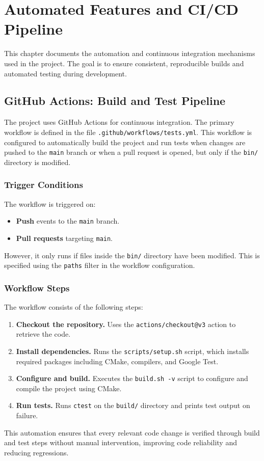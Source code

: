 \chapter{Automated Features and CI/CD Pipeline}
\label{ch:ci-cd}
\pagestyle{fancy}

This chapter documents the automation and continuous integration mechanisms used in the project. The goal is to ensure consistent, reproducible builds and automated testing during development.

\section{GitHub Actions: Build and Test Pipeline}
\label{sec:github-actions}

The project uses GitHub Actions for continuous integration. The primary workflow is defined in the file \texttt{.github/workflows/tests.yml}. This workflow is configured to automatically build the project and run tests when changes are pushed to the \texttt{main} branch or when a pull request is opened, but only if the \texttt{bin/} directory is modified.

\subsection*{Trigger Conditions}

The workflow is triggered on:
\begin{itemize}\itemsep0em
	\item \textbf{Push} events to the \texttt{main} branch.
	\item \textbf{Pull requests} targeting \texttt{main}.
\end{itemize}
However, it only runs if files inside the \texttt{bin/} directory have been modified. This is specified using the \texttt{paths} filter in the workflow configuration.

\subsection*{Workflow Steps}

The workflow consists of the following steps:
\begin{enumerate}
	\item \textbf{Checkout the repository.} Uses the \texttt{actions/checkout@v3} action to retrieve the code.
	\item \textbf{Install dependencies.} Runs the \texttt{scripts/setup.sh} script, which installs required packages including CMake, compilers, and Google Test.
	\item \textbf{Configure and build.} Executes the \texttt{build.sh -v} script to configure and compile the project using CMake.
	\item \textbf{Run tests.} Runs \texttt{ctest} on the \texttt{build/} directory and prints test output on failure.
\end{enumerate}
This automation ensures that every relevant code change is verified through build and test steps without manual intervention, improving code reliability and reducing regressions.
